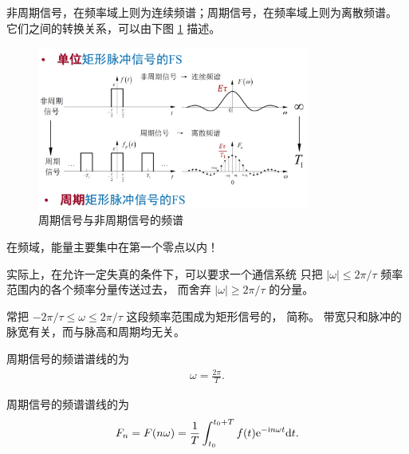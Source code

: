 \begin{remark}
    非周期信号，在频率域上则为连续频谱；周期信号，在频率域上则为离散频谱。
    它们之间的转换关系，可以由下图 \ref{fig:periodic-nonperiodic-signal} 描述。
    \begin{figure}[H]
        \centering
        \includegraphics[width = 0.8\textwidth]{chap2/img/periodic-nonperiodic-signal.png}
        \caption{周期信号与非周期信号的频谱}
        \label{fig:periodic-nonperiodic-signal}
    \end{figure}
\end{remark}

\begin{property}[周期矩形脉冲信号的特点]
    在频域，能量主要集中在第一个零点以内！

    实际上，在允许一定失真的条件下，可以要求一个通信系统
    只把 $|\omega| \le 2\pi/\tau$ 频率范围内的各个频率分量传送过去，
    而舍弃 $|\omega| \ge 2\pi/\tau$ 的分量。

    常把 $-2\pi/\tau \le \omega \le 2\pi/\tau$ 这段频率范围成为矩形信号的，
    简称。
    带宽只和脉冲的脉宽有关，而与脉高和周期均无关。
\end{property}

\begin{property}[周期信号的频谱谱线的特点]
    周期信号的频谱谱线的为
    \begin{align*}
        \omega = \frac{2\pi}{T}.
    \end{align*}

    
    周期信号的频谱谱线的为
    \begin{align*}
        F_n = F(n\omega) = \frac{1}{T}\int_{t_0}^{t_0 + T}f(t)\mathrm{e}^{-\mathrm{i} n\omega t}\mathrm{d}t.
    \end{align*}
\end{property}


